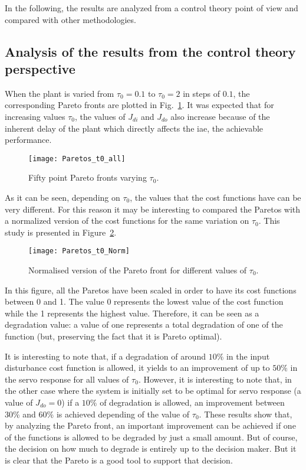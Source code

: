 In the following, the results are analyzed from a control theory point of view and compared with other methodologies.
\subsection{Analysis of the results from the control theory perspective}
\label{sec:Control}
%
When the plant is varied from $\tau_0=0.1$ to $\tau_0=2$ in steps of $0.1$, the corresponding Pareto fronts are plotted in Fig.~\ref{fig:Paretos_t0_all}. It was expected that for increasing values $\tau_0$, the values of $J_{di}$ and $J_{do}$ also increase because of the inherent delay of the plant which directly affects the \gls{iae}, the achievable performance.
%
\begin{figure}[tb]%
\centering
\texttt{[image: Paretos\_t0\_all]}%
\caption{Fifty point Pareto fronts varying $\tau_0$.}%
\label{fig:Paretos_t0_all}%
\end{figure}
%

As it can be seen, depending on $\tau_0$, the values that the cost functions have can be very different. For this reason it may be interesting to compared the Paretos with a normalized version of the cost functions for the same variation on $\tau_0$. This study is presented in Figure~\ref{fig:Paretos_t0_Norm}. %
%
\begin{figure}[tb]%
	\centering
	\texttt{[image: Paretos\_t0\_Norm]}%
	\caption{Normalised version of the Pareto front for different values of $\tau_0$.}%
	\label{fig:Paretos_t0_Norm}%
\end{figure}
%
In this figure, all the Paretos have been scaled in order to have its cost functions between 0 and 1. The value 0 represents the lowest value of the cost function while the 1 represents the highest value. Therefore, it can be seen as a degradation value: a value of one represents a total degradation of one of the function (but, preserving the fact that it is Pareto optimal).

It is interesting to note that, if a degradation of around $10\%$ in the input disturbance cost function is allowed, it yields to an improvement of up to $50\%$ in the servo response for all values of $\tau_0$. However, it is interesting to note that, in the other case where the system is initially set to be optimal for servo response (a value of $J_{do} = 0$) if a $10\%$ of degradation is allowed, an improvement between 30\% and 60\% is achieved depending of the value of $\tau_0$. These results show that, by analyzing the Pareto front, an important improvement can be achieved if one of the functions is allowed to be degraded  by just a small amount. But of course, the decision on how much to degrade is entirely up to the decision maker. But it is clear that the Pareto is a good tool to support that decision.


